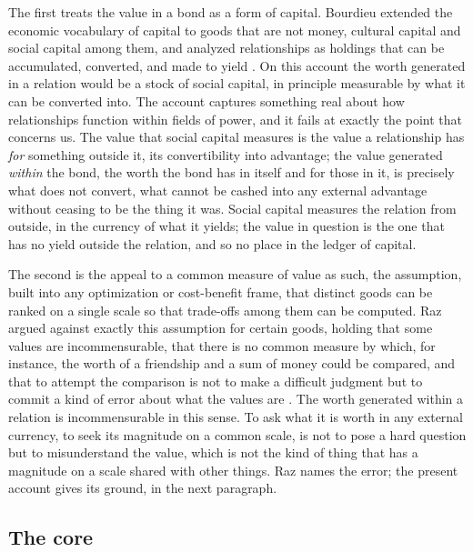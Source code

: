 The first treats the value in a bond as a form of capital. Bourdieu extended the economic vocabulary of capital to goods that are not money, cultural capital and social capital among them, and analyzed relationships as holdings that can be accumulated, converted, and made to yield \parencite{bourdieu1984distinction}. On this account the worth generated in a relation would be a stock of social capital, in principle measurable by what it can be converted into. The account captures something real about how relationships function within fields of power, and it fails at exactly the point that concerns us. The value that social capital measures is the value a relationship has \emph{for} something outside it, its convertibility into advantage; the value generated \emph{within} the bond, the worth the bond has in itself and for those in it, is precisely what does not convert, what cannot be cashed into any external advantage without ceasing to be the thing it was. Social capital measures the relation from outside, in the currency of what it yields; the value in question is the one that has no yield outside the relation, and so no place in the ledger of capital.

The second is the appeal to a common measure of value as such, the assumption, built into any optimization or cost-benefit frame, that distinct goods can be ranked on a single scale so that trade-offs among them can be computed. Raz argued against exactly this assumption for certain goods, holding that some values are incommensurable, that there is no common measure by which, for instance, the worth of a friendship and a sum of money could be compared, and that to attempt the comparison is not to make a difficult judgment but to commit a kind of error about what the values are \parencite{raz1986morality}. The worth generated within a relation is incommensurable in this sense. To ask what it is worth in any external currency, to seek its magnitude on a common scale, is not to pose a hard question but to misunderstand the value, which is not the kind of thing that has a magnitude on a scale shared with other things. Raz names the error; the present account gives its ground, in the next paragraph.

\subsection*{The core}

